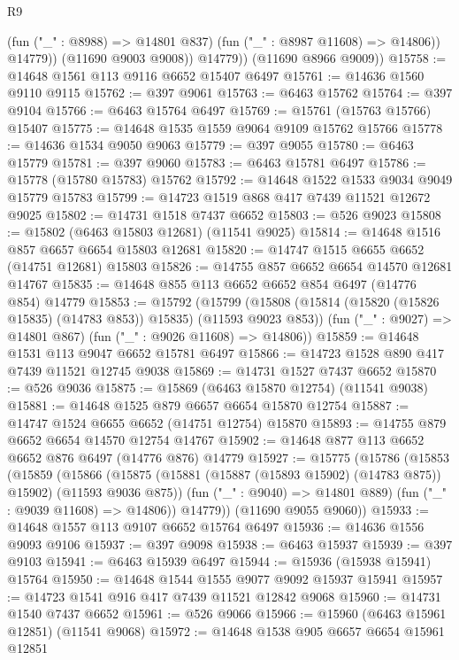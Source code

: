\begin{lexlean}{R9}
\begin{coremodule}
{{{{{{{{{{{{{{{{{{{{{{{{{{{{{{{{{{{{{{{{{{{{{{{{{{{{{{{{{{{{{{{{{{{{{{{{{{{{{{{{{{{{                  (fun ("_" : @8988) => @14801 @837)
                  (fun ("_" : @8987 @11608) => @14806))
                @14779))
            (@11690 @9003 @9008))
          @14779))
      (@11690 @8966 @9009))
@15758 := @14648 @1561 @113 @9116 @6652 @15407 @6497
@15761 := @14636 @1560 @9110 @9115
@15762 := @397 @9061
@15763 := @6463 @15762
@15764 := @397 @9104
@15766 := @6463 @15764 @6497
@15769 := @15761 (@15763 @15766) @15407
@15775 := @14648 @1535 @1559 @9064 @9109 @15762 @15766
@15778 := @14636 @1534 @9050 @9063
@15779 := @397 @9055
@15780 := @6463 @15779
@15781 := @397 @9060
@15783 := @6463 @15781 @6497
@15786 := @15778 (@15780 @15783) @15762
@15792 := @14648 @1522 @1533 @9034 @9049 @15779 @15783
@15799 := @14723 @1519 @868 @417 @7439 @11521 @12672 @9025
@15802 := @14731 @1518 @7437 @6652
@15803 := @526 @9023
@15808 := @15802 (@6463 @15803 @12681) (@11541 @9025)
@15814 := @14648 @1516 @857 @6657 @6654 @15803 @12681
@15820 := @14747 @1515 @6655 @6652 (@14751 @12681) @15803
@15826 := @14755 @857 @6652 @6654 @14570 @12681 @14767
@15835 := @14648 @855 @113 @6652 @6652 @854 @6497 (@14776 @854) @14779
@15853 := @15792
    (@15799
      (@15808 (@15814 (@15820 (@15826 @15835) (@14783 @853)) @15835) (@11593 @9023 @853))
      (fun ("_" : @9027) => @14801 @867)
      (fun ("_" : @9026 @11608) => @14806))
@15859 := @14648 @1531 @113 @9047 @6652 @15781 @6497
@15866 := @14723 @1528 @890 @417 @7439 @11521 @12745 @9038
@15869 := @14731 @1527 @7437 @6652
@15870 := @526 @9036
@15875 := @15869 (@6463 @15870 @12754) (@11541 @9038)
@15881 := @14648 @1525 @879 @6657 @6654 @15870 @12754
@15887 := @14747 @1524 @6655 @6652 (@14751 @12754) @15870
@15893 := @14755 @879 @6652 @6654 @14570 @12754 @14767
@15902 := @14648 @877 @113 @6652 @6652 @876 @6497 (@14776 @876) @14779
@15927 := @15775
    (@15786
      (@15853
        (@15859
          (@15866
            (@15875 (@15881 (@15887 (@15893 @15902) (@14783 @875)) @15902) (@11593 @9036 @875))
            (fun ("_" : @9040) => @14801 @889)
            (fun ("_" : @9039 @11608) => @14806))
          @14779))
      (@11690 @9055 @9060))
@15933 := @14648 @1557 @113 @9107 @6652 @15764 @6497
@15936 := @14636 @1556 @9093 @9106
@15937 := @397 @9098
@15938 := @6463 @15937
@15939 := @397 @9103
@15941 := @6463 @15939 @6497
@15944 := @15936 (@15938 @15941) @15764
@15950 := @14648 @1544 @1555 @9077 @9092 @15937 @15941
@15957 := @14723 @1541 @916 @417 @7439 @11521 @12842 @9068
@15960 := @14731 @1540 @7437 @6652
@15961 := @526 @9066
@15966 := @15960 (@6463 @15961 @12851) (@11541 @9068)
@15972 := @14648 @1538 @905 @6657 @6654 @15961 @12851
}}}}}}}}}}}}}}}}}}}}}}}}}}}}}}}}}}}}}}}}}}}}}}}}}}}}}}}}}}}}}}}}}}}}}}}}}}}}}}}}}}}}
\end{coremodule}
\end{lexlean}

